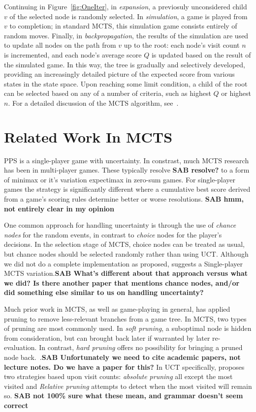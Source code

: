\documentclass[letterpaper]{article}
\begin{document}
Continuing in Figure~\ref{fig:OneIter}, in {\it expansion}, a previosuly unconsidered child $v$ of the selected node is randomly selected. In {\it simulation}, a game is played from $v$ to completion; in standard MCTS, this simulation game consists entirely of random moves. Finally, in {\it backpropagation}, the results of the simulation are used to update all nodes on the path from $v$ up to the root: each node's visit count $n$ is incremented, and each node's average score $Q$ is updated based on the result of the simulated game. In this way, the tree is gradually and selectively developed, providing an increasingly detailed picture of the expected score from various states in the state space. Upon reaching some limit condition, a child of the root can be selected based on any of a number of criteria, such as highest $Q$ or highest $n$. For a detailed discussion of the MCTS algorithm, see~\cite{browne2012survey}.

\section{Related Work In MCTS}

PPS is a single-player game with uncertainty. In constrast, much MCTS research has been in multi-player games. These typically resolve {\bf SAB resolve?} to a form of minimax or it's variation expectimax in zero-sum games. For single-player games the strategy is significantly different where a cumulative best score derived from a game's scoring rules determine better or worse resolutions. {\bf SAB hmm, not entirely clear in my opinion} 

One common approach for handling uncertainty is through the use of {\it chance nodes} for the random events, in contrast to {\it choice} nodes for the player's decisions. In the selection stage of MCTS, choice nodes can be treated as usual, but chance nodes should be selected randomly rather than using UCT. Although we did not do a complete implementation as proposed, \cite{schadd2012single} suggests a Single-player MCTS variation.{\bf SAB What's different about that approach versus what we did? Is there another paper that mentions chance nodes, and/or did something else similar to us on handling uncertainty?}

Much prior work in MCTS, as well as game-playing in general, has applied pruning to remove less-relevant branches from a game tree. In MCTS, two types of pruning are most commonly used. In {\it soft pruning}, a suboptimal node is hidden from consideration, but can brought back later if warranted by later re-evaluation. In contrast, {\it hard pruning} offers no possibility for bringing a pruned node back.~\cite{browne2010monte}.{\bf SAB Unfortunately we need to cite academic papers, not lecture notes. Do we have a paper for this?} In UCT specifically, \cite{huang2010pruning} proposes two strategies based upon visit counts: \emph{absolute pruning} all except the most visited and \emph{Relative pruning} attempts to detect when the most visited will remain so. {\bf SAB not 100\% sure what these mean, and grammar doesn't seem correct}
\end{document}

